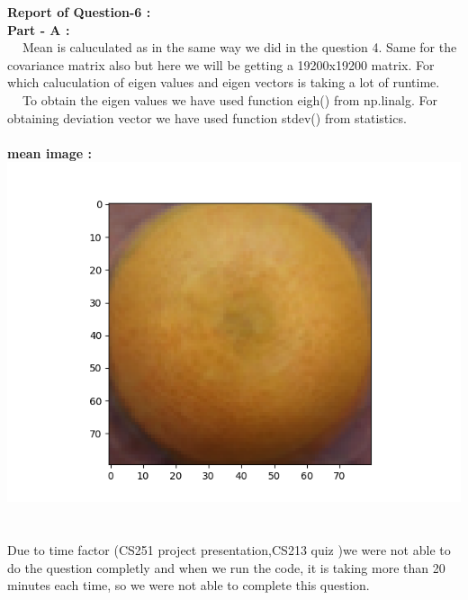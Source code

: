 \documentclass{article}
\begin{document}
$$ $$  
\textbf{\large Report of Question-6 :} \\
\textbf{Part - A :} \\
    $~~~~$ Mean is caluculated as in the same way we did in the question 4.
    Same for the covariance matrix also but here we will be getting a 19200x19200 matrix.
    For which caluculation of eigen values and eigen vectors is taking a lot of runtime.
    \\
    $~~~~$ To obtain the eigen values we have used function eigh() from np.linalg.
    For obtaining deviation vector we have used function stdev() from statistics.
    \\ \\
    \textbf{\large mean image :} \\
    \includegraphics[scale = .6]{q6/mean_image.png}\\
    \\ \\
    Due to time factor (CS251 project presentation,CS213 quiz )we were not able to do the question completly and when we run the code,
    it is taking more than 20 minutes each time, so we were not able to complete this question.
\end{document}
